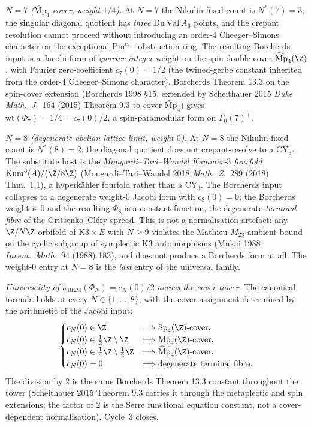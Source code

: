 \emph{$N = 7$ ($\widetilde{\mathrm{Mp}}_4$ cover, weight $1/4$).}
At $N = 7$ the Nikulin fixed count is $N^*(7) = 3$; the
singular diagonal quotient has \emph{three} $\mathrm{Du\ Val}\
A_6$ points, and the crepant resolution cannot proceed without
introducing an order-$4$ Cheeger--Simons character on the
exceptional $\mathrm{Pin}^{c, +}$-obstruction ring. The resulting
Borcherds input is a Jacobi form of \emph{quarter-integer}
weight on the spin double cover $\widetilde{\mathrm{Mp}}_4(\Z)$,
with Fourier zero-coefficient $c_7(0) = 1/2$ (the twined-gerbe
constant inherited from the order-$4$ Cheeger--Simons character).
Borcherds Theorem 13.3 on the spin-cover extension (Borcherds
1998 \S 15, extended by Scheithauer 2015 \emph{Duke Math.\ J.}~164
(2015) Theorem 9.3 to cover $\widetilde{\mathrm{Mp}}_4$) gives
$\mathrm{wt}(\Phi_7) = 1/4 = c_7(0)/2$, a spin-paramodular form
on $\Gamma_0(7)^+$.

\emph{$N = 8$ (degenerate abelian-lattice limit, weight $0$).} At
$N = 8$ the Nikulin fixed count is $N^*(8) = 2$; the diagonal
quotient does not crepant-resolve to a CY$_3$. The substitute host
is the \emph{Mongardi--Tari--Wandel Kummer-$3$ fourfold}
$\mathrm{Kum}^3(A)/(\Z/8\Z)$ (Mongardi--Tari--Wandel 2018
\emph{Math.\ Z.}~289 (2018) Thm.\ 1.1), a hyperk\"ahler fourfold
rather than a CY$_3$. The Borcherds input collapses to a
degenerate weight-$0$ Jacobi form with $c_8(0) = 0$; the
Borcherds weight is $0$ and the resulting $\Phi_8$ is a constant
function, the degenerate \emph{terminal fibre} of the
Gritsenko--Cl\'ery spread. This is not a normalisation artefact:
any $\Z/N\Z$-orbifold of $\mathrm{K3} \times E$ with $N \geq 9$
violates the Mathieu $M_{23}$-ambient bound on the cyclic
subgroup of symplectic K3 automorphisms (Mukai 1988
\emph{Invent.\ Math.}~94 (1988) 183), and does not produce a
Borcherds form at all. The weight-$0$ entry at $N = 8$ is the
\emph{last} entry of the universal family.

\emph{Universality of $\kappa_{\mathrm{BKM}}(\Phi_N) = c_N(0)/2$
across the cover tower.} The canonical formula holds at every
$N \in \{1, \ldots, 8\}$, with the cover assignment determined
by the arithmetic of the Jacobi input:
\[
  \begin{cases}
    c_N(0) \in \Z & \Longrightarrow \mathrm{Sp}_4(\Z)\text{-cover}, \\
    c_N(0) \in \tfrac{1}{2}\Z \setminus \Z &
      \Longrightarrow \mathrm{Mp}_4(\Z)\text{-cover}, \\
    c_N(0) \in \tfrac{1}{4}\Z \setminus \tfrac{1}{2}\Z &
      \Longrightarrow \widetilde{\mathrm{Mp}}_4(\Z)\text{-cover}, \\
    c_N(0) = 0 & \Longrightarrow \text{degenerate terminal fibre}.
  \end{cases}
\]
The division by $2$ is the same Borcherds Theorem 13.3 constant
throughout the tower (Scheithauer 2015 Theorem 9.3 carries it
through the metaplectic and spin extensions; the factor of $2$ is
the Serre functional equation constant, not a cover-dependent
normalisation). Cycle~3 closes.

